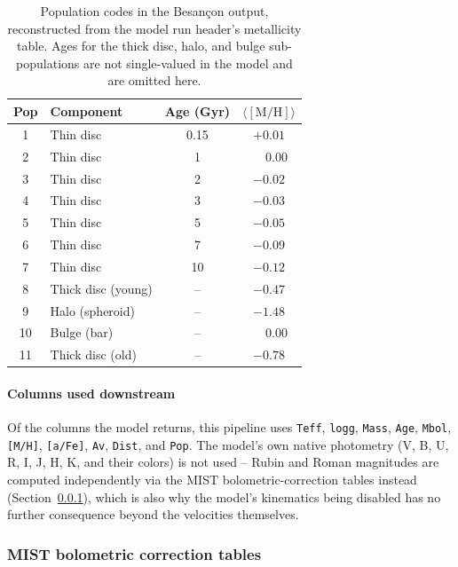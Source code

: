 \documentclass[english,10pt,a4paper]{article}
\begin{document}
	\begin{table}[htbp]
		\centering
		\begin{tabular}{clcc}
			\toprule
			\textbf{Pop} & \textbf{Component} & \textbf{Age (Gyr)} & \textbf{$\langle\mathrm{[M/H]}\rangle$} \\
			\midrule
			1  & Thin disc            & 0.15 & $+0.01$ \\
			2  & Thin disc            & 1    & $\phantom{+}0.00$ \\
			3  & Thin disc            & 2    & $-0.02$ \\
			4  & Thin disc            & 3    & $-0.03$ \\
			5  & Thin disc            & 5    & $-0.05$ \\
			6  & Thin disc            & 7    & $-0.09$ \\
			7  & Thin disc            & 10   & $-0.12$ \\
			8  & Thick disc (young)   & --   & $-0.47$ \\
			9  & Halo (spheroid)      & --   & $-1.48$ \\
			10 & Bulge (bar)          & --   & $\phantom{+}0.00$ \\
			11 & Thick disc (old)     & --   & $-0.78$ \\
			\bottomrule
		\end{tabular}
		\caption{Population codes in the Besan\c{c}on output, reconstructed from the model run header's metallicity table. Ages for the thick disc, halo, and bulge sub-populations are not single-valued in the model and are omitted here.}
		\label{tab:pop_codes}
	\end{table}
	
	\paragraph{Columns used downstream}
	
	Of the columns the model returns, this pipeline uses \texttt{Teff}, \texttt{logg}, \texttt{Mass}, \texttt{Age}, \texttt{Mbol}, \texttt{[M/H]}, \texttt{[a/Fe]}, \texttt{Av}, \texttt{Dist}, and \texttt{Pop}. The model's own native photometry (V, B, U, R, I, J, H, K, and their colors) is not used -- Rubin and Roman magnitudes are computed independently via the MIST bolometric-correction tables instead (Section~\ref{subsec:mist}), which is also why the model's kinematics being disabled has no further consequence beyond the velocities themselves.
	
	\subsubsection{MIST bolometric correction tables}
	\label{subsec:mist}
	
\end{document}
